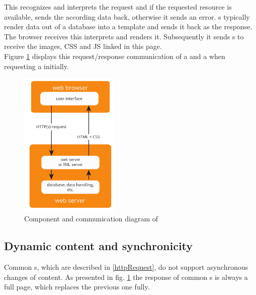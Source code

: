 \noindent{}This recognizes and interprets the request and if the requested resource is available, sends the according data back, otherwise it sends an error.
\WebApplication{}s typically render data out of a database into a \html{} template and sends it back as the response.
The browser receives this \webPage{} interprets and renders it.
Subsequently it sends \httpRequest{}s to receive the images, CSS and JS linked in this page.
\\
Figure \ref{fig:http_components} displays this request/response communication of a \webBrowser{} and a \webServer{} when requesting a \webPage{} initially.

\begin{figure}[H]
\centering
\includegraphics[height=7cm]{images/http.pdf}
\caption[http_components]{Component and communication diagram of \http{}}
\label{fig:http_components}
\end{figure}

\subsection{Dynamic content and synchronicity\label{synchronicity}}

Common \httpRequest{}s, which are described in \ref{httpRequest}, do not support asynchronous changes of content. As presented in fig. \ref{fig:http_components} the response of common \httpRequest{}s is always a full page, which replaces the previous one fully.

